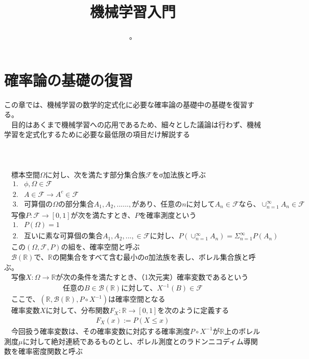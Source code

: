 \documentclass{jsarticle}
\title{機械学習入門}
\author{。}
\begin{document}
\maketitle
\section{確率論の基礎の復習}
この章では、機械学習の数学的定式化に必要な確率論の基礎中の基礎を復習する。\\
　目的はあくまで機械学習への応用であるため、細々とした議論は行わず、機械学習を定式化するために必要な最低限の項目だけ解説する\\
　\\
 　\\
\scalebox{1.1}{1.確率空間と確率変数}\\
　標本空間$\Omega$に対し、次を満たす部分集合族$\mathcal{F}$をσ加法族と呼ぶ
\begin{eqnarray}
&1.&\phi,\Omega\in\mathcal{F}\\
&2.&A\in\mathcal{F}\rightarrow A^c\in\mathcal{F}\\
&3.&可算個の\Omega の部分集合 A_1,A_2,......,があり、任意のnに対してA_n\in\mathcal{F}なら、\cup^\infty_{n=1} A_n\in\mathcal{F}
\end{eqnarray}
　写像$P:\mathcal{F}\rightarrow[0,1]$が次を満たすとき、$P$を確率測度という
\begin{eqnarray}
&1.&P(\Omega)=1\\
&2.&互いに素な可算個の集合A_1,A_2,...,\in\mathcal{F}に対し、P(\cup^\infty_{n=1}A_n)=\Sigma^\infty_{n=1}P(A_n)
\end{eqnarray}
　この$(\Omega,\mathcal{F},P)$の組を、確率空間と呼ぶ\\
　$\mathcal{B}(\mathbb{R})$で、$\mathbb{R}$の開集合をすべて含む最小のσ加法族を表し、ボレル集合族と呼ぶ。\\
　写像$X:\Omega\rightarrow\mathbb{R}$が次の条件を満たすとき、（1次元実）確率変数であるという
\begin{eqnarray}
任意のB\in\mathcal{B}(\mathbb{R})に対して、X^{-1}(B)\in\mathcal{F}
\end{eqnarray}
　ここで、$(\mathbb{R},\mathcal{B}(\mathbb{R}),P\circ X^{-1})$は確率空間となる\\
　確率変数$X$に対して、分布関数$F_X:\mathbb{R}\rightarrow[0,1]$を次のように定義する
\begin{eqnarray}
F_X(x):=P(X\leq x)
\end{eqnarray}
　今回扱う確率変数は、その確率変数に対応する確率測度$P\circ X^{-1}$が$\mathbb{R}$上のボレル測度$\mu$に対して絶対連続であるものとし、ボレル測度とのラドンニコディム導関数を確率密度関数と呼ぶ\\
\end{document}
